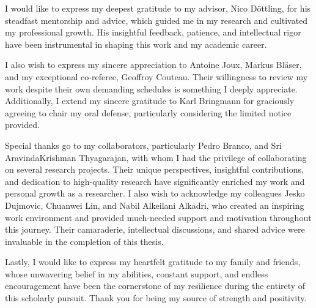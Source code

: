 
 I would like to express my deepest gratitude to my advisor, Nico D\"ottling, for his steadfast mentorship and advice, which guided me in my research and cultivated my professional growth. His insightful feedback, patience, and intellectual rigor have been instrumental in shaping this work and my academic career.

I also wish to express my sincere appreciation to Antoine Joux, Markus Bl\"aser, and my exceptional co-referee, Geoffroy Couteau. Their willingness to review my work despite their own demanding schedules is something I deeply appreciate. Additionally, I extend my sincere gratitude to Karl Bringmann for graciously agreeing to chair my oral defense, particularly considering the limited notice provided.

Special thanks go to my collaborators, particularly Pedro Branco, and Sri AravindaKrishman Thyagarajan, with whom I had the privilege of collaborating on several research projects. Their unique perspectives, insightful contributions, and dedication to high-quality research have significantly enriched my work and personal growth as a researcher.
I also wish to acknowledge my colleagues Jesko Dujmovic, Chuanwei Lin, and Nabil Alkeilani Alkadri, who created an inspiring work environment and provided much-needed support and motivation throughout this journey. Their camaraderie, intellectual discussions, and shared advice were invaluable in the completion of this thesis.

Lastly, I would like to express my heartfelt gratitude to my family and friends, whose unwavering belief in my abilities, constant support, and endless encouragement have been the cornerstone of my resilience during the entirety of this scholarly pursuit. Thank you for being my source of strength and positivity.
